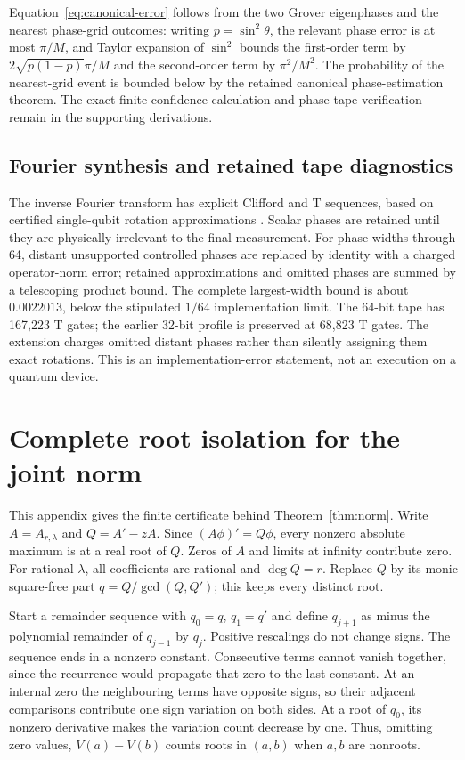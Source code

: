 \documentclass[11pt]{article}
\begin{document}
Equation~\eqref{eq:canonical-error} follows from the two Grover eigenphases and the nearest phase-grid
outcomes: writing $p=\sin^2\theta$, the relevant phase error is at most
$\pi/M$, and Taylor expansion of $\sin^2$ bounds the first-order term by
$2\sqrt{p(1-p)}\pi/M$ and the second-order term by $\pi^2/M^2$.
The probability of the nearest-grid event is bounded below by the retained
canonical phase-estimation theorem.  The exact finite confidence calculation
and phase-tape verification remain in the supporting derivations.

\subsection{Fourier synthesis and retained tape diagnostics}
\label{app:fourier-diagnostics}

The inverse Fourier transform has explicit Clifford and T sequences,
based on certified single-qubit rotation approximations
\citep{rossselinger2016}.  Scalar phases are retained until they are
physically irrelevant to the final measurement.  For phase widths through
64, distant unsupported controlled phases are replaced by identity with a
charged operator-norm error; retained approximations and omitted phases
are summed by a telescoping product bound.
The complete largest-width bound is about $0.0022013$, below the stipulated
$1/64$ implementation limit.  The 64-bit tape has 167,223 T gates; the earlier 32-bit
profile is preserved at 68,823 T gates.  The extension charges omitted
distant phases rather than silently assigning them exact rotations.
This is an implementation-error statement, not an execution on a quantum
device.


\section{Complete root isolation for the joint norm}
\label{app:roots}

This appendix gives the finite certificate behind
Theorem~\ref{thm:norm}.  Write $A=A_{r,\lambda}$ and $Q=A'-zA$.
Since $(A\phi)'=Q\phi$, every nonzero absolute maximum is at a real root
of $Q$.  Zeros of $A$ and limits at infinity contribute zero.
For rational $\lambda$, all coefficients are rational and $\deg Q=r$.
Replace $Q$ by its monic square-free part $q=Q/\gcd(Q,Q')$; this keeps
every distinct root.

Start a remainder sequence with $q_0=q$, $q_1=q'$ and define
$q_{j+1}$ as minus the polynomial remainder of $q_{j-1}$ by $q_j$.
Positive rescalings do not change signs.  The sequence ends in a nonzero
constant.  Consecutive terms cannot vanish together, since the recurrence
would propagate that zero to the last constant.  At an internal zero the
neighbouring terms have opposite signs, so their adjacent comparisons
contribute one sign variation on both sides.  At a root of $q_0$, its
nonzero derivative makes the variation count decrease by one.
Thus, omitting zero values, $V(a)-V(b)$ counts roots in $(a,b)$ when
$a,b$ are nonroots.
\end{document}
